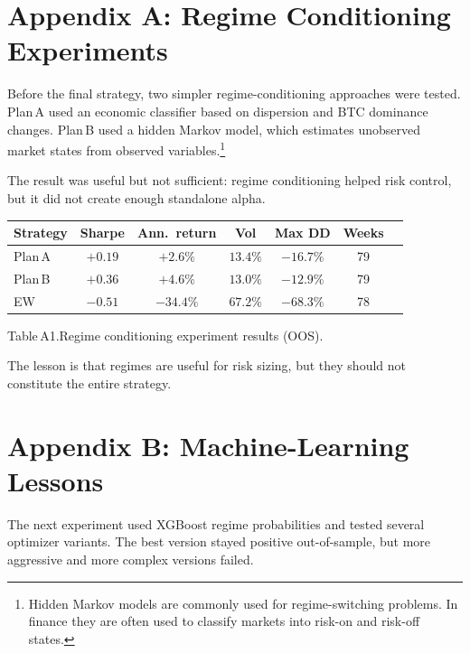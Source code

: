 \documentclass[11pt,a4paper]{article}
\begin{document}
\appendix
\section{Appendix A: Regime Conditioning Experiments}

Before the final strategy, two simpler regime-conditioning approaches were tested. Plan\,A used an economic classifier based on dispersion and BTC dominance changes. Plan\,B used a hidden Markov model, which estimates unobserved market states from observed variables.\footnote{Hidden Markov models are commonly used for regime-switching problems. In finance they are often used to classify markets into risk-on and risk-off states.}

The result was useful but not sufficient: regime conditioning helped risk control, but it did not create enough standalone alpha.

\begin{center}
\begin{tabular}{lcccccl}
\toprule
\rowcolor{tablehead}
\textbf{Strategy} & \textbf{Sharpe} & \textbf{Ann.\ return} & \textbf{Vol} & \textbf{Max DD} & \textbf{Weeks} \\
\midrule
Plan\,A & $+0.19$ & $+2.6\%$ & $13.4\%$ & $-16.7\%$ & 79 \\
Plan\,B & $+0.36$ & $+4.6\%$ & $13.0\%$ & $-12.9\%$ & 79 \\
EW      & $-0.51$ & $-34.4\%$ & $67.2\%$ & $-68.3\%$ & 78 \\
\bottomrule
\end{tabular}
\end{center}
\smallskip
{\small Table\,A1.\;Regime conditioning experiment results (OOS).}

The lesson is that regimes are useful for risk sizing, but they should not constitute the entire strategy.

\section{Appendix B: Machine-Learning Lessons}

The next experiment used XGBoost regime probabilities and tested several optimizer variants. The best version stayed positive out-of-sample, but more aggressive and more complex versions failed.
\end{document}
